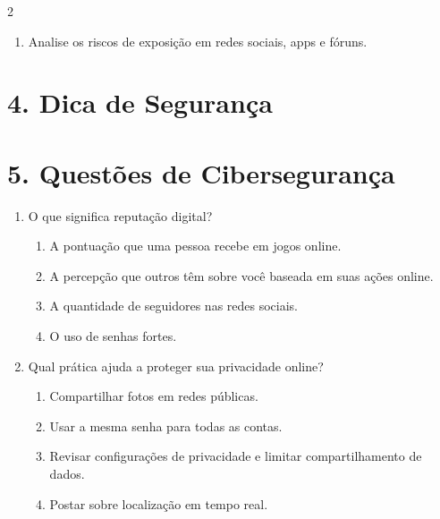 \documentclass[11pt]{article}
\begin{document}
\begin{multicols}{2}
\begin{enumerate}[leftmargin=*]
\item Analise os riscos de exposição em redes sociais, apps e fóruns.\\[4\baselineskip]

\end{enumerate}


\vspace{5mm}

\section*{4. Dica de Segurança}

\begin{center}
\end{center}

\section*{5. Questões de Cibersegurança}

\begin{enumerate}[leftmargin=*]

\item O que significa reputação digital?
\begin{enumerate}[label=\alph*)]
\item A pontuação que uma pessoa recebe em jogos online.
\item A percepção que outros têm sobre você baseada em suas ações online.
\item A quantidade de seguidores nas redes sociais.
\item O uso de senhas fortes.
\end{enumerate}

\item Qual prática ajuda a proteger sua privacidade online?
\begin{enumerate}[label=\alph*)]
\item Compartilhar fotos em redes públicas.
\item Usar a mesma senha para todas as contas.
\item Revisar configurações de privacidade e limitar compartilhamento de dados.
\item Postar sobre localização em tempo real.
\end{enumerate}


\end{enumerate}
\end{multicols}
\end{document}
